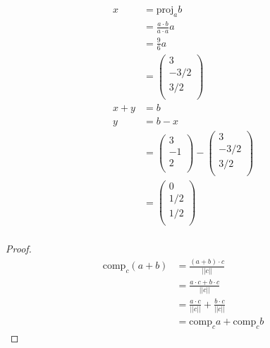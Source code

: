 \documentclass[12pt]{article}
\newenvironment{problem}[2][Problem]{\begin{trivlist}
\item[\hskip \labelsep {\bfseries #1}\hskip \labelsep {\bfseries #2.}]}{\end{trivlist}}
\begin{document}
\begin{problem}{2}
\end{problem}
\begin{align*}
x &= \text{proj}_a b \\
&= \frac{a \cdot b}{a \cdot a} a \\
&= \frac{9}{6} a \\
&= 
\left( \begin{array}{c}
	3\\
	-3/2\\
	3/2\\
\end{array} \right) \\
x + y &= b\\
y &= b - x \\
&= 
\left( \begin{array}{c}
	3\\
	-1\\
	2\\
\end{array} \right) 
-
\left( \begin{array}{c}
	3\\
	-3/2\\
	3/2\\
\end{array} \right) \\
&=
\left( \begin{array}{c}
	0\\
	1/2\\
	1/2\\
\end{array} \right) \\
\end{align*}
\filbreak

\begin{problem}{3}
\end{problem}
\begin{proof}
\begin{align*}
\text{comp}_c (a+b) &= \frac{(a+b) \cdot c}{||c||} \\
&= \frac{a \cdot c  + b \cdot c}{||c||} \\
&= \frac{a \cdot c}{||c||}  + \frac{b \cdot c}{||c||} \\
&= \text{comp}_c a + \text{comp}_c b
\end{align*}
\end{proof}
\filbreak
\end{document}
